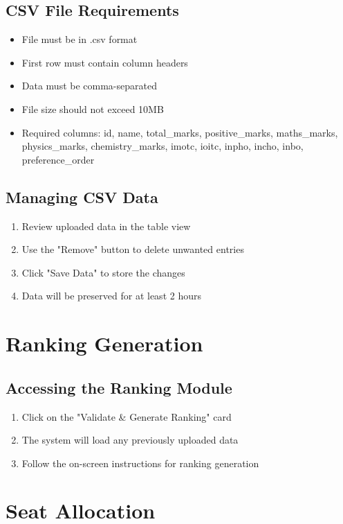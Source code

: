 \documentclass[12pt,a4paper]{article}
\begin{document}
\subsection{CSV File Requirements}
\begin{itemize}
    \item File must be in .csv format
    \item First row must contain column headers
    \item Data must be comma-separated
    \item File size should not exceed 10MB
    \item Required columns: id, name, total\_marks, positive\_marks, maths\_marks, physics\_marks, chemistry\_marks, imotc, ioitc, inpho, incho, inbo, preference\_order
\end{itemize}

\subsection{Managing CSV Data}
\begin{enumerate}
    \item Review uploaded data in the table view
    \item Use the "Remove" button to delete unwanted entries
    \item Click "Save Data" to store the changes
    \item Data will be preserved for at least 2 hours
\end{enumerate}

\section{Ranking Generation}
\subsection{Accessing the Ranking Module}
\begin{enumerate}
    \item Click on the "Validate \& Generate Ranking" card
    \item The system will load any previously uploaded data
    \item Follow the on-screen instructions for ranking generation
\end{enumerate}

\section{Seat Allocation}
\end{document}
